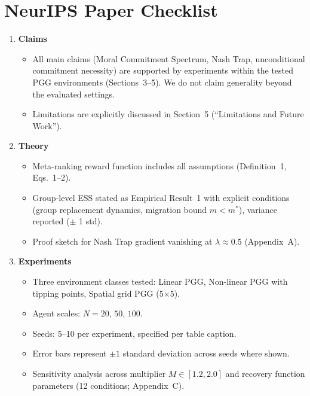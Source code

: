 
\section*{NeurIPS Paper Checklist}

\begin{enumerate}

\item {\bf Claims}
\begin{itemize}
    \item[$\checkmark$] All main claims (Moral Commitment Spectrum, Nash Trap, unconditional commitment necessity) are supported by experiments within the tested PGG environments (Sections~3--5). We do not claim generality beyond the evaluated settings.
    \item[$\checkmark$] Limitations are explicitly discussed in Section~5 (``Limitations and Future Work'').
\end{itemize}

\item {\bf Theory}
\begin{itemize}
    \item[$\checkmark$] Meta-ranking reward function includes all assumptions (Definition~1, Eqs.~1--2).
    \item[$\checkmark$] Group-level ESS stated as Empirical Result~1 with explicit conditions (group replacement dynamics, migration bound $m < m^*$), variance reported ($\pm$ 1 std).
    \item[$\checkmark$] Proof sketch for Nash Trap gradient vanishing at $\lambda \approx 0.5$ (Appendix~A).
\end{itemize}

\item {\bf Experiments}
\begin{itemize}
    \item[$\checkmark$] Three environment classes tested: Linear PGG, Non-linear PGG with tipping points, Spatial grid PGG (5$\times$5).
    \item[$\checkmark$] Agent scales: $N = 20$, $50$, $100$.
    \item[$\checkmark$] Seeds: 5--10 per experiment, specified per table caption.
    \item[$\checkmark$] Error bars represent $\pm 1$ standard deviation across seeds where shown.
    \item[$\checkmark$] Sensitivity analysis across multiplier $M \in [1.2, 2.0]$ and recovery function parameters (12 conditions; Appendix~C).
\end{itemize}


\end{enumerate}
